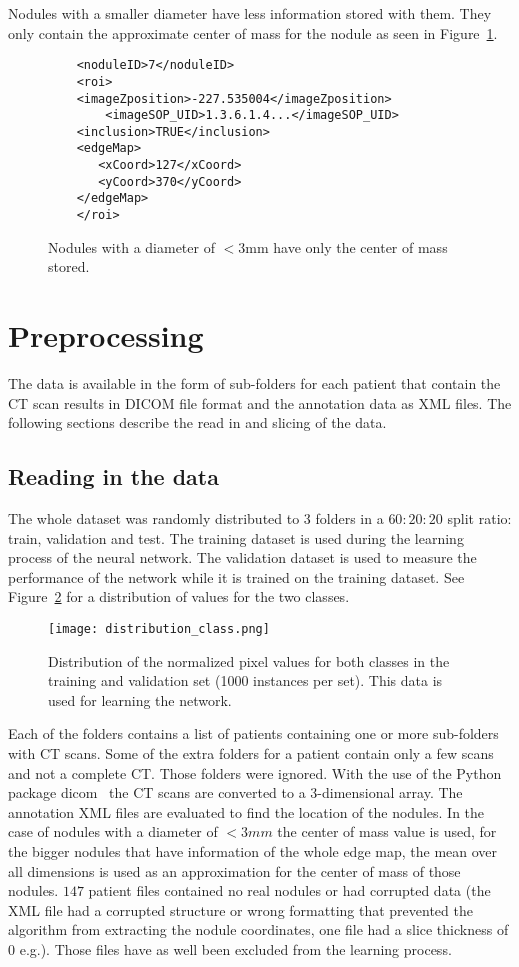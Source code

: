 \documentclass[../Thesis.tex]{subfiles}
\begin{document}
Nodules with a smaller diameter have less information stored with them. They only contain the approximate center of mass for the nodule as seen in Figure~\ref{fig:smallNod}.

\begin{figure}
\begin{lstlisting}
	<noduleID>7</noduleID>
	<roi>
	<imageZposition>-227.535004</imageZposition>
        <imageSOP_UID>1.3.6.1.4...</imageSOP_UID>
	<inclusion>TRUE</inclusion>
	<edgeMap>
	   <xCoord>127</xCoord>
	   <yCoord>370</yCoord>
	</edgeMap>
	</roi>
\end{lstlisting}
\caption{Nodules with a diameter of $<3$mm have only the center of mass stored.}
\label{fig:smallNod}
\end{figure}

\section{Preprocessing}
The data is available in the form of sub-folders for each patient that contain the CT scan results in DICOM file format and the annotation data as XML files. The following sections describe the read in and slicing of the data.

\subsection{Reading in the data}
The whole dataset was randomly distributed to 3 folders in a $60:20:20$ split ratio: train, validation and test. The training dataset is used during the learning process of the neural network. The validation dataset is used to measure the performance of the network while it is trained on the training dataset. See Figure~\ref{fig:ttdist} for a distribution of values for the two classes.
 
\begin{figure}
\texttt{[image: distribution\_class.png]}
\caption{Distribution of the normalized pixel values for both classes in the training and validation set (1000 instances per set). This data is used for learning the network.}
\label{fig:ttdist}
\end{figure}

Each of the folders contains a list of patients containing one or more sub-folders with CT scans. Some of the extra folders for a patient contain only a few scans and not a complete CT. Those folders were ignored. With the use of the Python package dicom~\cite{mason2011t} the CT scans are converted to a 3-dimensional array. The annotation XML files are evaluated to find the location of the nodules. In the case of nodules with a diameter of $<3mm$ the center of mass value is used, for the bigger nodules that have information of the whole edge map, the mean over all dimensions is used as an approximation for the center of mass of those nodules. 
$147$ patient files contained no real nodules or had corrupted data (the XML file had a corrupted structure or wrong formatting that prevented the algorithm from extracting the nodule coordinates, one file had a slice thickness of $0$ e.g.). Those files have as well been excluded from the learning process.
\end{document}
